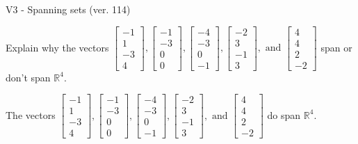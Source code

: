 \begin{exercise}
  \begin{exerciseTitle}V3 - Spanning sets (ver. 114)\end{exerciseTitle}
  \begin{exerciseStatement}
    Explain why the vectors \(\left[\begin{array}{r}
-1 \\
1 \\
-3 \\
4
\end{array}\right] , \left[\begin{array}{r}
-1 \\
-3 \\
0 \\
0
\end{array}\right] , \left[\begin{array}{r}
-4 \\
-3 \\
0 \\
-1
\end{array}\right] , \left[\begin{array}{r}
-2 \\
3 \\
-1 \\
3
\end{array}\right] , \text{ and } \left[\begin{array}{r}
4 \\
4 \\
2 \\
-2
\end{array}\right]\) span or don't span \(\mathbb{R}^4\). 
	


  \end{exerciseStatement}
  \begin{exerciseAnswer}
   The vectors \(\left[\begin{array}{r}
-1 \\
1 \\
-3 \\
4
\end{array}\right] , \left[\begin{array}{r}
-1 \\
-3 \\
0 \\
0
\end{array}\right] , \left[\begin{array}{r}
-4 \\
-3 \\
0 \\
-1
\end{array}\right] , \left[\begin{array}{r}
-2 \\
3 \\
-1 \\
3
\end{array}\right] , \text{ and } \left[\begin{array}{r}
4 \\
4 \\
2 \\
-2
\end{array}\right]\) 
  	 do  
	span \(\mathbb{R}^4\).
  



\end{exerciseAnswer}
\end{exercise}
